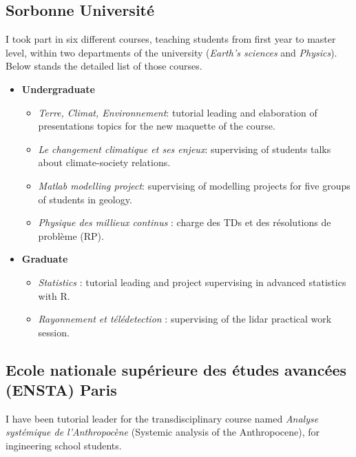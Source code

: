     \subsection*{Sorbonne Université}
    I took part in six different courses, teaching students from first year to master level, within two departments of the university (\textit{Earth's sciences} and \textit{Physics}). 
    Below stands the detailed list of those courses. 
    
    \begin{itemize}
        \item[] \textbf{Undergraduate}
        \begin{itemize}
            \item \textit{Terre, Climat, Environnement}: tutorial leading and elaboration of presentations topics for the new maquette of the course.
        \end{itemize}
        \begin{itemize}
            \item \textit{Le changement climatique et ses enjeux}: supervising of students talks about climate-society relations.
        \end{itemize}
        \begin{itemize}
            \item \textit{Matlab modelling project}: supervising of modelling projects for five groups of students in geology.
            \item \textit{Physique des millieux continus} : charge des TDs et des résolutions de problème (RP).
        \end{itemize}
        \item[] \textbf{Graduate}
        \begin{itemize}
            \item \textit{Statistics} : tutorial leading and project supervising in advanced statistics with R.
            \item \textit{Rayonnement et télédetection} : supervising of the lidar practical work session.
        \end{itemize}
    \end{itemize}

    \subsection*{Ecole nationale supérieure des études avancées (ENSTA) Paris}
    I have been tutorial leader for the transdisciplinary course named \textit{Analyse systémique de l'Anthropocène} (Systemic analysis of the Anthropocene), for ingineering school students.

